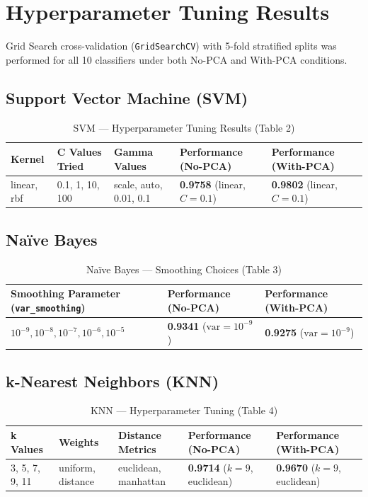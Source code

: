 \documentclass[12pt,a4paper]{article}
\begin{document}
\section{Hyperparameter Tuning Results}
Grid Search cross-validation (\texttt{GridSearchCV}) with 5-fold stratified splits was performed for all 10 classifiers under both No-PCA and With-PCA conditions.

\subsection{Support Vector Machine (SVM)}
\begin{table}[H]
\centering
\caption{SVM — Hyperparameter Tuning Results (Table 2)}
\label{tab:svm_tuning}
\begin{tabular}{|p{2.5cm}|p{2.5cm}|p{2.5cm}|p{3.2cm}|p{3.2cm}|}
\hline
\textbf{Kernel} & \textbf{C Values Tried} & \textbf{Gamma Values} & \textbf{Performance (No-PCA)} & \textbf{Performance (With-PCA)}\\ \hline
linear, rbf & 0.1, 1, 10, 100 & scale, auto, 0.01, 0.1 & \textbf{0.9758} (linear, $C=0.1$) & \textbf{0.9802} (linear, $C=0.1$)\\ \hline
\end{tabular}
\end{table}

\subsection{Na\"ive Bayes}
\begin{table}[H]
\centering
\caption{Na\"ive Bayes — Smoothing Choices (Table 3)}
\label{tab:nb_tuning}
\begin{tabular}{|p{5.5cm}|p{4.5cm}|p{4.5cm}|}
\hline
\textbf{Smoothing Parameter (\texttt{var\_smoothing})} & \textbf{Performance (No-PCA)} & \textbf{Performance (With-PCA)}\\ \hline
$10^{-9}, 10^{-8}, 10^{-7}, 10^{-6}, 10^{-5}$ & \textbf{0.9341} ($\text{var}=10^{-9}$) & \textbf{0.9275} ($\text{var}=10^{-9}$)\\ \hline
\end{tabular}
\end{table}

\subsection{k-Nearest Neighbors (KNN)}
\begin{table}[H]
\centering
\caption{KNN — Hyperparameter Tuning (Table 4)}
\label{tab:knn_tuning}
\begin{tabular}{|p{2.5cm}|p{2.5cm}|p{3cm}|p{3.2cm}|p{3.2cm}|}
\hline
\textbf{k Values} & \textbf{Weights} & \textbf{Distance Metrics} & \textbf{Performance (No-PCA)} & \textbf{Performance (With-PCA)}\\ \hline
3, 5, 7, 9, 11 & uniform, distance & euclidean, manhattan & \textbf{0.9714} ($k=9$, euclidean) & \textbf{0.9670} ($k=9$, euclidean)\\ \hline
\end{tabular}
\end{table}
\end{document}
